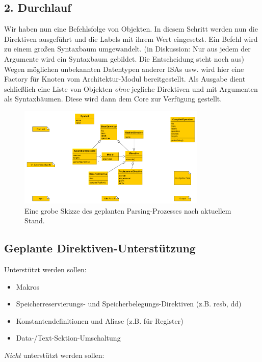 \subsection{2. Durchlauf}

Wir haben nun eine Befehlsfolge von Objekten. In diesem Schritt werden nun die
Direktiven ausgeführt und die Labels mit ihrem Wert eingesetzt.  Ein Befehl wird
zu einem großen Syntaxbaum umgewandelt. (in Diskussion: Nur aus jedem der
Argumente wird ein Syntaxbaum gebildet. Die Entscheidung steht noch aus) Wegen
möglichen unbekannten Datentypen anderer ISAs usw. wird hier eine Factory für
Knoten vom Architektur-Modul bereitgestellt.  Als Ausgabe dient schließlich eine
Liste von Objekten \emph{ohne} jegliche Direktiven und mit Argumenten als
Syntaxbäumen. Diese wird dann dem Core zur Verfügung gestellt.

\begin{figure}[h!]
  \centering
  \includegraphics[width=0.8\textwidth]{../parser/figures/process.png}
  \caption{Eine grobe Skizze des geplanten Parsing-Prozesses nach aktuellem Stand.}
\end{figure}

\subsection{Geplante Direktiven-Unterstützung} Unterstützt werden sollen:

\begin{itemize}
\item Makros
\item Speicherreservierungs- und Speicherbelegungs-Direktiven (z.B. resb, dd)
\item Konstantendefinitionen und Aliase (z.B. für Register)
\item Data-/Text-Sektion-Umschaltung
\end{itemize}

\emph{Nicht} unterstützt werden sollen:

